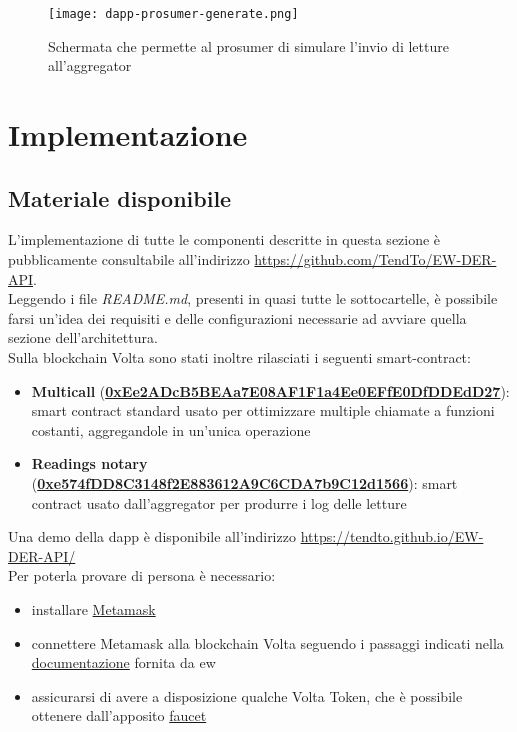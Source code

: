 \begin{figure}[H]
    \texttt{[image: dapp-prosumer-generate.png]}
    \centering
    \caption{Schermata che permette al \gls{prosumer} di simulare l'invio di letture all'\gls{aggregator}}
    \label{lab:dapp-prosumer-generate}
\end{figure}

\section{Implementazione}

\subsection{Materiale disponibile}
L'implementazione di tutte le componenti descritte in questa sezione è pubblicamente consultabile all'indirizzo \href{https://github.com/TendTo/EW-DER-API}{https://github.com/TendTo/EW-DER-API}. \\
Leggendo i file \textit{README.md}, presenti in quasi tutte le sottocartelle, è possibile farsi un'idea dei requisiti e delle configurazioni necessarie
ad avviare quella sezione dell'architettura. \\

Sulla blockchain Volta sono stati inoltre rilasciati i seguenti smart-contract:

\begin{itemize}
    \item \textbf{Multicall} (\href{https://volta-explorer.energyweb.org/address/0xEe2ADcB5BEAa7E08AF1F1a4Ee0EFfE0DfDDEdD27/contracts}{\textbf{0xEe2ADcB5BEAa7E08AF1F1a4Ee0EFfE0DfDDEdD27}}): smart contract standard usato per ottimizzare multiple chiamate a funzioni costanti, aggregandole in un'unica operazione \cite{sftw:multicall}
    \item \textbf{Readings notary} (\href{https://volta-explorer.energyweb.org/address/0xe574fDD8C3148f2E883612A9C6CDA7b9C12d1566/contracts}{\textbf{0xe574fDD8C3148f2E883612A9C6CDA7b9C12d1566}}): smart contract usato dall'\gls{aggregator} per produrre i log delle letture
\end{itemize}

Una demo della \gls{dapp} è disponibile all'indirizzo \href{https://tendto.github.io/EW-DER-API/}{https://tendto.github.io/EW-DER-API/} \\
Per poterla provare di persona è necessario:
\begin{itemize}
    \item installare \href{https://metamask.io/}{Metamask}
    \item connettere Metamask alla blockchain Volta seguendo i passaggi indicati nella \href{https://energy-web-foundation.gitbook.io/energy-web/how-tos-and-tutorials/connect-to-energy-web-chain-main-network-with-metamash}{documentazione} fornita da \gls{ew}
    \item assicurarsi di avere a disposizione qualche Volta Token, che è possibile ottenere dall'apposito \href{https://voltafaucet.energyweb.org/}{faucet}
\end{itemize}


